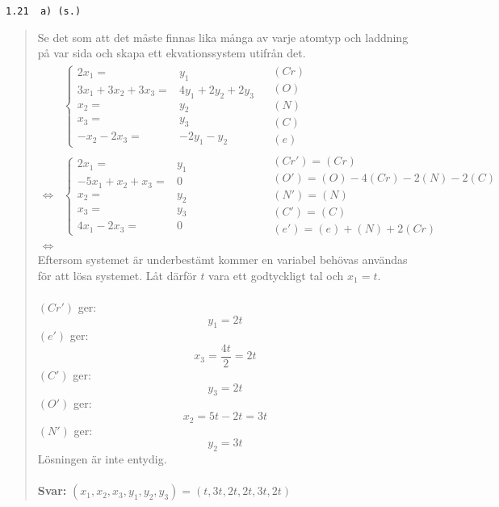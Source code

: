 \documentclass[a4paper]{article}
\newcommand{\tskcol}[1]{\textcolor{tskcol}{#1}}
\begin{document}
\texttt{\tskcol{1.21~~a) (s.)}}
\begin{quotation}
	\noindent
	Se det som att det måste finnas lika många av varje atomtyp och laddning på var sida och skapa ett ekvationssystem utifrån det.
	\begin{align*}
	&\left\{\begin{array}{rl}
	2x_1=&y_1 \\
	3x_1+3x_2+3x_3=&4y_1+2y_2+2y_3 \\
	x_2=&y_2 \\
	x_3=&y_3 \\
	-x_2-2x_3=&-2y_1-y_2
	\end{array}\right.
	&\begin{array}{l}
	(Cr) \\
	(O) \\
	(N) \\
	(C) \\
	(e)
	\end{array} \\ \Leftrightarrow
	&\left\{\begin{array}{rl}
	2x_1=&y_1 \\
	-5x_1+x_2+x_3=&0 \\
	x_2=&y_2 \\
	x_3=&y_3 \\
	4x_1-2x_3=&0
	\end{array}\right.
	&\begin{array}{l}
	(Cr')=(Cr) \\
	(O')=(O)-4(Cr)-2(N)-2(C) \\
	(N')=(N) \\
	(C')=(C) \\
	(e')=(e)+(N)+2(Cr)
	\end{array} \\ \Leftrightarrow
	\end{align*}
	Eftersom systemet är underbestämt kommer en variabel behövas användas för att lösa systemet. Låt därför $t$ vara ett godtyckligt tal och $x_1=t$. \\ \\
	$(Cr')$ ger:
	\[y_1=2t\]
	$(e')$ ger:
	\[x_3=\frac{4t}{2}=2t\]
	$(C')$ ger:
	\[y_3=2t\]
	$(O')$ ger:
	\[x_2=5t-2t=3t\]
	$(N')$ ger:
	\[y_2=3t\]
	Lösningen är inte entydig.
	\\ \\
	\textbf{Svar:} $(x_1,x_2,x_3,y_1,y_2,y_3)=(t,3t,2t,2t,3t,2t)$
\end{quotation}
\end{document}
